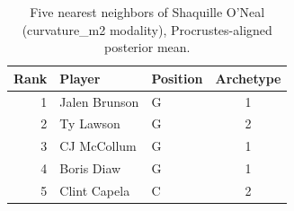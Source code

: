 \begin{table}[htbp]
  \centering\small
  \begin{tabular}{rllc}
    \toprule
    Rank & Player & Position & Archetype \\
    \midrule
    1 & Jalen Brunson & G & 1 \\
    2 & Ty Lawson & G & 2 \\
    3 & CJ McCollum & G & 1 \\
    4 & Boris Diaw & G & 1 \\
    5 & Clint Capela & C & 2 \\
    \bottomrule
  \end{tabular}
  \caption{Five nearest neighbors of Shaquille O'Neal (curvature_m2 modality), Procrustes-aligned posterior mean.}
  \label{tab:Shaquille_O_Neal_neighbors_curvature_m2}
\end{table}

